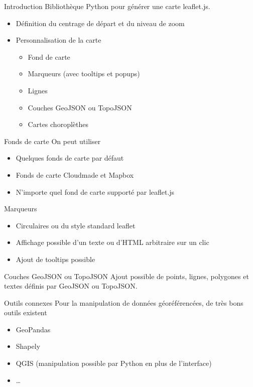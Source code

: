 \begin{frame}{Introduction}
  Bibliothèque Python pour générer une carte leaflet.js.

  \begin{itemize}
    \item Définition du centrage de départ et du niveau de zoom
    \item Personnalisation de la carte
      \begin{itemize}
        \item Fond de carte
        \item Marqueurs (avec tooltips et popups)
        \item Lignes
        \item Couches GeoJSON ou TopoJSON
        \item Cartes choroplèthes
      \end{itemize}
  \end{itemize}
\end{frame}

\begin{frame}{Fonds de carte}
  On peut utiliser
  \begin{itemize}
    \item Quelques fonds de carte par défaut
    \item Fonds de carte Cloudmade et Mapbox
    \item N'importe quel fond de carte supporté par leaflet.js
  \end{itemize}
\end{frame}

\begin{frame}{Marqueurs}
  \begin{itemize}
    \item Circulaires ou du style standard leaflet
    \item Affichage possible d'un texte ou d'HTML arbitraire sur un clic
    \item Ajout de tooltips possible
  \end{itemize}
\end{frame}

\begin{frame}{Couches GeoJSON ou TopoJSON}
  Ajout possible de points, lignes, polygones et textes définis par GeoJSON ou TopoJSON.
\end{frame}

\begin{frame}{Outils connexes}
  Pour la manipulation de données géoréférencées, de très bons outils existent

  \begin{itemize}
    \item GeoPandas
    \item Shapely
    \item QGIS (manipulation possible par Python en plus de l'interface)
    \item …
  \end{itemize}
\end{frame}

